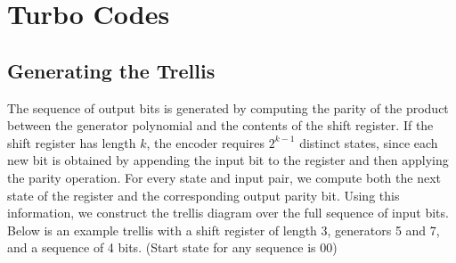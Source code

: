 \newpage
\section{Turbo Codes}

\subsection{Generating the Trellis}
The sequence of output bits is generated by computing the parity of the 
product between the generator polynomial and the contents of the shift register. 
If the shift register has length $k$, the encoder requires $2^{k-1}$ distinct states, 
since each new bit is obtained by appending the input bit to the register and 
then applying the parity operation. For every state and input pair, we compute both 
the next state of the register and the corresponding output parity bit. 
Using this information, we construct the trellis diagram over the full sequence 
of input bits.\\
Below is an example trellis with a shift register of length 3, generators 5 and 7, and a sequence of 4 bits. (Start state for any sequence is 00)

